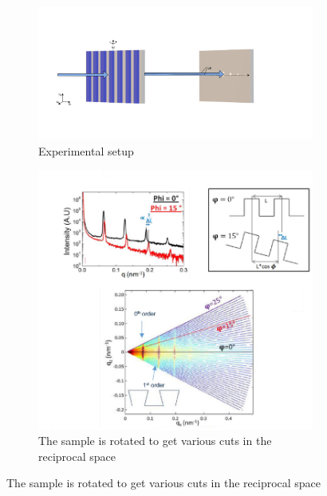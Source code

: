 \begin{figure}[h]
    \centering
    \begin{minipage}{0.6\textwidth}
        \centering
        \begin{subfigure}[b]{\textwidth}
            \includegraphics[width=\textwidth]{images/cdsaxs_diff.png}
            \caption{Experimental setup}
            \label{fig:exp_setup}
        \end{subfigure}
    \end{minipage}%
    \hfill
    \begin{minipage}{0.4\textwidth}
        \centering
        \begin{subfigure}[b]{\textwidth}
            \includegraphics[width=\textwidth]{images/intensity_qz.png}
            \caption{The sample is rotated to get various cuts in the reciprocal space}
        \end{subfigure}
    \end{minipage}
    

\end{figure}
